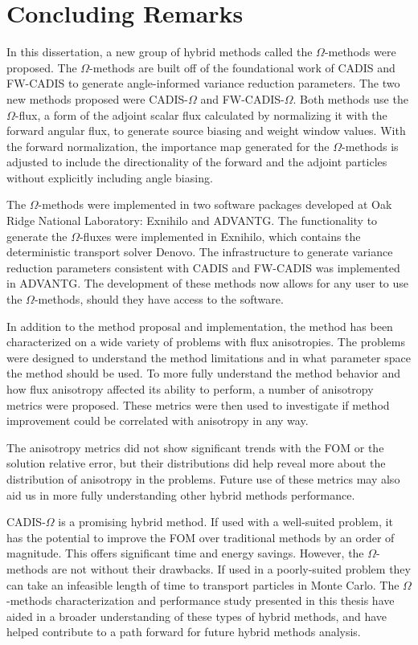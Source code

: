 \section{Concluding Remarks}
\label{sec:concluding-remarks}

In this dissertation, a new group of hybrid methods called the $\Omega$-methods
were
proposed. The $\Omega$-methods are built off of the foundational work of CADIS
and FW-CADIS to generate angle-informed variance reduction parameters. The two
new methods proposed were CADIS-$\Omega$ and FW-CADIS-$\Omega$. Both methods use
the $\Omega$-flux, a form of the adjoint scalar flux calculated by normalizing
it with the forward angular flux, to generate source biasing and weight window
values. With the forward normalization, the importance map generated for the
$\Omega$-methods is adjusted to include the directionality of
the forward and the adjoint particles without explicitly including angle
biasing.

The $\Omega$-methods were implemented in two software packages developed at Oak
Ridge National Laboratory: Exnihilo and ADVANTG. The functionality to generate
the $\Omega$-fluxes were implemented in Exnihilo, which contains the
deterministic transport solver Denovo. The infrastructure to generate variance
reduction parameters consistent with CADIS and FW-CADIS was implemented in
ADVANTG. The development of these methods now allows for any user to use the
$\Omega$-methods, should they have access to the software.

In addition to the method proposal and implementation, the method has been
characterized on a wide variety of problems with flux anisotropies. The problems
were designed to understand the method limitations and in what parameter space
the method should be used. To more fully understand the method behavior and how
flux anisotropy affected its ability to perform, a number of anisotropy metrics
were proposed. These metrics were then used
to investigate if method improvement could be correlated with
anisotropy in any way.

The anisotropy metrics did not show significant trends with the FOM or the
solution relative error, but their distributions did help reveal more about the
distribution of anisotropy in the problems. Future use of these metrics may also
aid us in more fully understanding other hybrid methods performance.

CADIS-$\Omega$ is a promising hybrid method. If used with a well-suited problem,
it has the potential to improve the FOM over traditional methods by an order of
magnitude. This offers significant time and energy savings. However, the
$\Omega$-methods are not without their drawbacks. If used in a poorly-suited
problem they can take an infeasible length of time to transport particles in
Monte Carlo. The $\Omega$-methods characterization and performance study
presented in this thesis have aided in a broader understanding of these types of
hybrid methods, and have helped contribute to a path forward for future hybrid
methods analysis.


